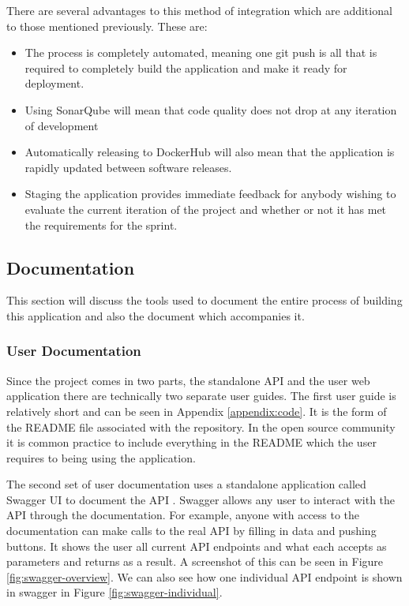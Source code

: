 There are several advantages to this method of integration which are additional to those mentioned previously. These are:

\begin{itemize}
	\item The process is completely automated, meaning one git push is all that is required to completely build the application and make it ready for deployment.
	\item Using SonarQube will mean that code quality does not drop at any iteration of development
	\item Automatically releasing to DockerHub will also mean that the application is rapidly updated between software releases.
	\item Staging the application provides immediate feedback for anybody wishing to evaluate the current iteration of the project and whether or not it has met the requirements for the sprint.
\end{itemize} 

\subsection{Documentation}
This section will discuss the tools used to document the entire process of building this application and also the document which accompanies it.
\subsubsection{User Documentation}
Since the project comes in two parts, the standalone API and the user web application there are technically two separate user guides. The first user guide is relatively short and can be seen in Appendix \ref{appendix:code}. It is the form of the README file associated with the repository. In the open source community it is common practice to include everything in the README which the user requires to being using the application. 

The second set of user documentation uses a standalone application called Swagger UI to document the API \citep{Swagger2017}. Swagger allows any user to interact with the API through the documentation. For example, anyone with access to the documentation can make calls to the real API by filling in data and pushing buttons. It shows the user all current API endpoints and what each accepts as parameters and returns as a result. A screenshot of this can be seen in Figure \ref{fig:swagger-overview}. We can also see how one individual API endpoint is shown in swagger in Figure \ref{fig:swagger-individual}.

